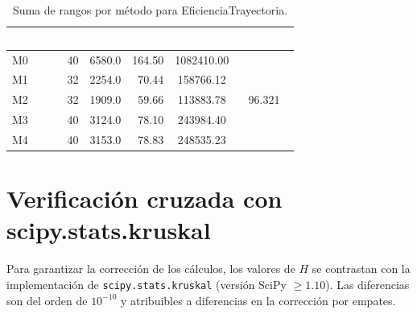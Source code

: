 \documentclass[12pt,a4paper,oneside]{book}
\begin{document}
\begin{table}[H]
\centering
\small
\caption{Suma de rangos por método para EficienciaTrayectoria.}
\begin{tabular}{lcrrcc}
\toprule
\rowcolor{primary}
\textcolor{white}{\textbf{Método}} & \textcolor{white}{$n_j$} & \textcolor{white}{$R_j$} & \textcolor{white}{$\bar{R}_j$} & \textcolor{white}{$R_j^2/n_j$} & \textcolor{white}{H global} \\
\midrule
M0 & 40 & 6580.0 & 164.50 & 1082410.00 & \multirow{5}{*}{96.321} \\
M1 & 32 & 2254.0 & 70.44 & 158766.12 & \\
M2 & 32 & 1909.0 & 59.66 & 113883.78 & \\
M3 & 40 & 3124.0 & 78.10 & 243984.40 & \\
M4 & 40 & 3153.0 & 78.83 & 248535.23 & \\
\bottomrule
\end{tabular}
\end{table}

\newpage
\section{Verificación cruzada con scipy.stats.kruskal}

Para garantizar la corrección de los cálculos, los valores de $H$ se contrastan con la implementación de \texttt{scipy.stats.kruskal} (versión SciPy $\geq 1.10$). Las diferencias son del orden de $10^{-10}$ y atribuibles a diferencias en la corrección por empates.
\end{document}
